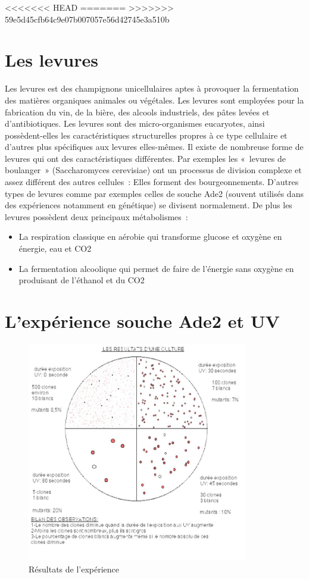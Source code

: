 <<<<<<< HEAD
\label{DefLevures}
=======
>>>>>>> 59e5d45cfb64c9e07b007057e56d42745e3a510b
\section{Les levures}
Les levures est des champignons unicellulaires aptes à provoquer la fermentation des matières organiques animales ou végétales. Les levures sont employées pour la fabrication du vin, de la bière, des alcools industriels, des pâtes levées et d'antibiotiques. Les levures sont des micro-organismes eucaryotes, ainsi possèdent-elles les caractéristiques structurelles propres à ce type cellulaire et d'autres plus spécifiques aux levures elles-mêmes. Il existe de nombreuse forme de levures qui ont des caractéristiques différentes. Par exemples les « levures de boulanger » (Saccharomyces cerevisiae) ont un processus de division complexe et assez différent des autres cellules : Elles forment des bourgeonnements. D’autres types de levures comme par exemples celles de souche Ade2 (souvent utilisés dans des expériences notamment  en génétique) se divisent normalement. De plus les levures possèdent deux principaux métabolismes :

\begin{itemize}
	\item La respiration classique en aérobie qui transforme glucose et oxygène en énergie, eau et CO2 
	\item La fermentation alcoolique qui permet de faire de l’énergie sans oxygène en produisant de l’éthanol  et du CO2

\end{itemize}

\section{L’expérience souche Ade2 et UV}
\begin{figure}[H]
	\centering
	\includegraphics[width=26em]{Annexes/Images/lev.jpg}
	\caption{Résultats de l'expérience}
\end{figure}

